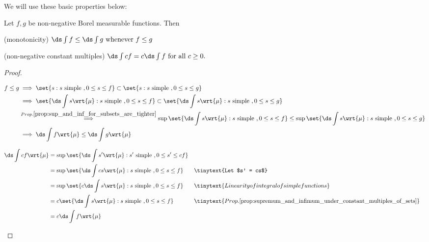 \documentclass{article} %
\begin{document}

We will use these basic properties below:
\begin{proposition}
Let $f,g$ be non-negative Borel measurable functions. Then
\begin{alphabate}
\item (monotonicity) $\ds\int f \leq \ds\int g \text{ whenever } f \leq g$
\item (non-negative constant multiples) $\ds\int cf = c \ds\int f \text{ for all } c \geq 0.$	
\end{alphabate}
\label{prop:properties_of_integrals_of_non_negative_borel_measurable_functions}
\end{proposition}

\begin{proof}
\begin{alphabate}
\item 
\begin{align*}
f \leq g & \implies \set{s : s \text{ simple } , 0 \leq s \leq f} \subset \set{s:  s \text{ simple } , 0 \leq s \leq g} \\
& \implies 	\set{ \ds\int s \wrt{\mu}  :   s \text{ simple } , 0 \leq s \leq f} \subset \set{ \ds\int s \wrt{\mu} :  s \text{ simple } , 0 \leq s \leq g} \\
& \stackrel{Prop. \ref{prop:sup_and_inf_for_subsets_are_tighter}}{\implies} \sup \set{ \ds\int s \wrt{\mu}  :  s \text{ simple } , 0 \leq s \leq f} \leq  \sup \set{ \ds\int s \wrt{\mu} :   s \text{ simple } , 0 \leq s \leq g} \\
& \implies \ds\int f \wrt{\mu} \leq \ds\int g \wrt{\mu} 
\end{align*}
\item 
\begin{align*}
\ds\int c f \wrt{\mu} &= \sup \set{\ds\int s' \wrt{\mu} : s' \text{ simple } , 0 \leq s' \leq cf} \\
&=  \sup  \set{\ds\int cs \wrt{\mu}   : s\text{ simple } , 0 \leq s \leq f} && \tinytext{Let $s' = cs$} \\
&= \sup  \set{c \ds\int s \wrt{\mu}   : s\text{ simple } , 0 \leq s \leq f} && \tinytext{Linearity of integral of simple functions} \\
&= c \set{ \ds\int s \wrt{\mu}   : s\text{ simple } , 0 \leq s \leq f} && \tinytext{Prop. \ref{prop:supremum_and_infimum_under_constant_multiples_of_sets}}\\
&= c \ds\int f \wrt{\mu} 
\end{align*}
\end{alphabate}

\end{proof}
\end{document}
